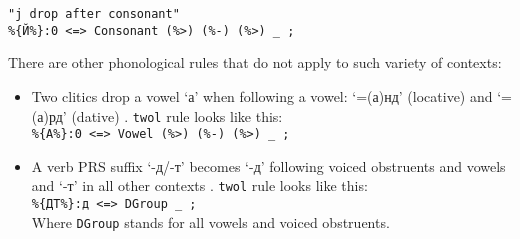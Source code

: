 \begin{code_frame}[float]
    \begin{verbatim}
"j drop after consonant"
%{Й%}:0 <=> Consonant (%>) (%-) (%>) _ ;
    \end{verbatim}
    \tcblower
    \label{code:5_2}
\end{code_frame}

There are other phonological rules that do not apply to such variety of contexts:
\begin{itemize}
    \item Two clitics drop a vowel `а' when following a vowel: `=(а)нд' (locative) and `=(а)рд' (dative) . \texttt{twol} rule looks like this:\\
    \texttt{\%\{А\%\}:0 <=> Vowel (\%>) (\%-) (\%>) \_ ;}
    \item A verb PRS suffix `-д/-т' becomes `-д' following voiced obstruents and vowels and `-т' in all other contexts \parencite[262]{parker_shughni_2023}. \texttt{twol} rule looks like this:\\
    \texttt{\%\{ДТ\%\}:д <=> DGroup \_ ;}\\
    Where \texttt{DGroup} stands for all vowels and voiced obstruents.
\end{itemize}

